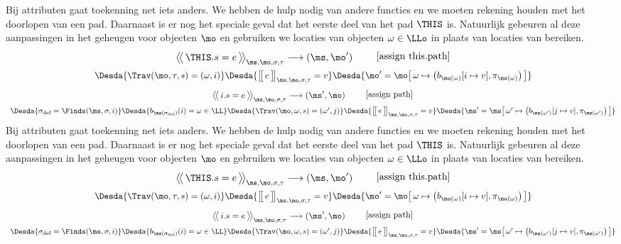 Bij attributen gaat toekenning net iets anders. We hebben de hulp nodig van andere functies en we moeten rekening houden met het doorlopen van een pad. Daarnaast is er nog het speciale geval dat het eerste deel van het pad $\THIS$ is. Natuurlijk gebeuren al deze aanpassingen in het geheugen voor objecten $\mo$ en gebruiken we locaties van objecten $\omega\in\LLo$ in plaats van locaties van bereiken.
%
\begin{gather*}
  \AxiomC{$
    \Config{\THIS.s = e}{\ms, \mo, \sigma, \tau}
    \longrightarrow
    (\ms, \mo')
  $}
  {\DisplayProof}
  \tag*{[assign this.path]} \\
  \Desdas{
    \Desda{\Trav(\mo, \tau, s) = (\omega, i)}
    \Desda{\Surr{e}_{\ms, \mo, \sigma, \tau} = v}
    \Desda{\mo'= \mo \surr{ \omega \mapsto \big(b_{\mo(\omega)}[ i \mapsto v ], \pi_{\mo(\omega)}\big) }}
  }
\end{gather*}
%
\begin{gather*}
  \AxiomC{$
    \Config{i.s = e}{\ms, \mo, \sigma, \tau}
    \longrightarrow
    (\ms', \mo)
  $}
  {\DisplayProof}
  \tag*{[assign path]} \\
  \Desdas{
    \Desda{\sigma_\text{def} = \Finds(\ms, \sigma, i)}
    \Desda{b_{\ms(\sigma_\text{def})}(i) = \omega \in \LL}
    \Desda{\Trav(\mo, \omega, s) = (\omega', j)}
    \Desda{\Surr{e}_{\ms, \mo, \sigma, \tau} = v}
    \Desda{\ms'= \ms \surr{ \omega' \mapsto \big(b_{\ms(\omega')}[ j \mapsto v ], \pi_{\ms(\omega')}\big) }}
  }
\end{gather*}
%
Bij attributen gaat toekenning net iets anders. We hebben de hulp nodig van andere functies en we moeten rekening houden met het doorlopen van een pad. Daarnaast is er nog het speciale geval dat het eerste deel van het pad $\THIS$ is. Natuurlijk gebeuren al deze aanpassingen in het geheugen voor objecten $\mo$ en gebruiken we locaties van objecten $\omega\in\LLo$ in plaats van locaties van bereiken.
%
\begin{gather*}
  \AxiomC{$
    \Config{\THIS.s = e}{\ms, \mo, \sigma, \tau}
    \longrightarrow
    (\ms, \mo')
  $}
  {\DisplayProof}
  \tag*{[assign this.path]} \\
  \Desdas{
    \Desda{\Trav(\mo, \tau, s) = (\omega, i)}
    \Desda{\Surr{e}_{\ms, \mo, \sigma, \tau} = v}
    \Desda{\mo'= \mo \surr{ \omega \mapsto \big(b_{\mo(\omega)}[ i \mapsto v ], \pi_{\mo(\omega)}\big) }}
  }
\end{gather*}
%
\begin{gather*}
  \AxiomC{$
    \Config{i.s = e}{\ms, \mo, \sigma, \tau}
    \longrightarrow
    (\ms', \mo)
  $}
  {\DisplayProof}
  \tag*{[assign path]} \\
  \Desdas{
    \Desda{\sigma_\text{def} = \Finds(\ms, \sigma, i)}
    \Desda{b_{\ms(\sigma_\text{def})}(i) = \omega \in \LL}
    \Desda{\Trav(\mo, \omega, s) = (\omega', j)}
    \Desda{\Surr{e}_{\ms, \mo, \sigma, \tau} = v}
    \Desda{\ms'= \ms \surr{ \omega' \mapsto \big(b_{\ms(\omega')}[ j \mapsto v ], \pi_{\ms(\omega')}\big) }}
  }
\end{gather*}

